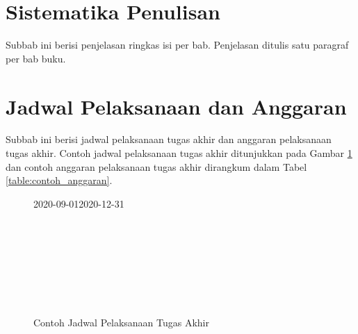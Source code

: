 \section{Sistematika Penulisan}

Subbab ini berisi penjelasan ringkas isi per bab. Penjelasan ditulis satu paragraf per bab buku.

\section{Jadwal Pelaksanaan dan Anggaran}

Subbab ini berisi jadwal pelaksanaan tugas akhir dan anggaran pelaksanaan tugas akhir. Contoh jadwal pelaksanaan tugas akhir ditunjukkan pada Gambar \ref{figure:contoh_jadwal_pelaksanaan} dan contoh anggaran pelaksanaan tugas akhir dirangkum dalam Tabel \ref{table:contoh_anggaran}.

\begin{figure}[h]
	\small
	\centering
	\begin{ganttchart}[
		hgrid,
		vgrid,
		y unit chart=0.5cm,
		y unit title=0.6cm,
		title height=1,
		x unit=1mm,
		time slot format=isodate,
		time slot unit=day]{2020-09-01}{2020-12-31}
		 \\
		 \\
		 \\
		 \\
		 \\
		 \\
		 \\
		 \\
	\end{ganttchart}
	\caption{Contoh Jadwal Pelaksanaan Tugas Akhir}
	\label{figure:contoh_jadwal_pelaksanaan}
\end{figure}

